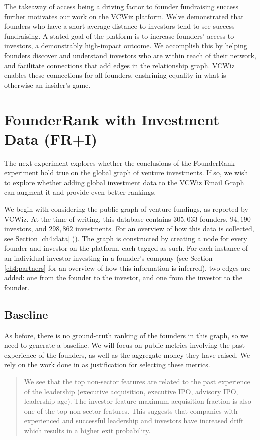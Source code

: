 The takeaway of access being a driving factor to founder fundraising success further motivates our work on the VCWiz platform. We've demonstrated that founders who have a short average distance to investors tend to see success fundraising. A stated goal of the platform is to increase founders' access to investors, a demonstrably high-impact outcome. We accomplish this by helping founders discover and understand investors who are within reach of their network, and facilitate connections that add edges in the relationship graph. VCWiz enables these connections for all founders, enshrining equality in what is otherwise an insider's game.

\section{FounderRank with Investment Data (FR+I)}

The next experiment explores whether the conclusions of the FounderRank experiment hold true on the global graph of venture investments. If so, we wish to explore whether adding global investment data to the VCWiz Email Graph can augment it and provide even better rankings.

We begin with considering the public graph of venture fundings, as reported by VCWiz. At the time of writing, this database contains $305,033$ founders, $94,190$ investors, and $298,862$ investments. For an overview of how this data is collected, see Section \ref{ch4:data} (\pageref{ch4:data}). The graph is constructed by creating a node for every founder and investor on the platform, each tagged as such. For each instance of an individual investor investing in a founder's company (see Section \ref{ch4:partners} for an overview of how this information is inferred), two edges are added: one from the founder to the investor, and one from the investor to the founder.

\subsection{Baseline}

As before, there is no ground-truth ranking of the founders in this graph, so we need to generate a baseline. We will focus on public metrics involving the past experience of the founders, as well as the aggregate money they have raised. We rely on the work done in \cite{2017arXiv170604229H} as justification for selecting these metrics.

\begin{quote}
We see that the top non-sector features are related to the past experience of the leadership (executive acquisition, executive IPO, advisory IPO, leadership age). The investor feature maximum acquisition fraction is also one of the top non-sector features. This suggests that companies with experienced and successful leadership and investors have increased drift which results in a higher exit probability.
\end{quote}

